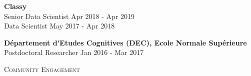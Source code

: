 \documentclass[9pt]{article}
\newenvironment{changemargin}[2]{%
  \begin{list}{}{%
    \setlength{\topsep}{0pt}%
    \setlength{\leftmargin}{#1}%
    \setlength{\rightmargin}{#2}%
    \setlength{\listparindent}{\parindent}%
    \setlength{\itemindent}{\parindent}%
    \setlength{\parsep}{\parskip}%
  }%
  \item[]}{\end{list}
}
\newcommand{\lineover}{
	\begin{changemargin}{-0.05in}{-0.05in}
		\vspace*{-8pt}
		\hrulefill \\
		\vspace*{-2pt}
	\end{changemargin}
}
\newcommand{\header}[1]{
	\begin{changemargin}{-0.5in}{-0.5in}
		\scshape{#1}\\
  	\lineover
	\end{changemargin}
}
\newenvironment{body} {
	\vspace*{-16pt}
	\begin{changemargin}{-0.25in}{-0.5in}
  }	
	{\end{changemargin}
}
\begin{document}
\begin{body}
	\textbf{Classy}\\
	Senior Data Scientist \hfill Apr 2018 - Apr 2019\\
	Data Scientist \hfill May 2017 - Apr 2018\\
	\medskip
	\medskip

	
	\textbf{D\'epartement d'Etudes Cognitives (DEC), Ecole Normale Sup\'erieure}\\
	Postdoctoral Researcher \hfill Jan 2016 - Mar 2017\\
	\medskip
	
\end{body}

\smallskip


\header{\color{red}Community Engagement}
\end{document}
